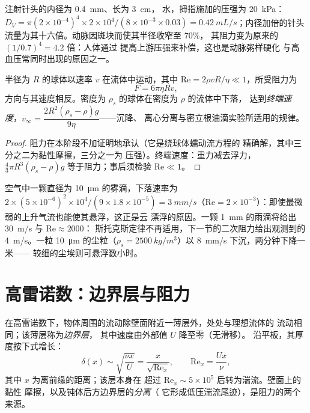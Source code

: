 \begin{example}[四次方]\label{ex:b2:viscous-flows:fourth}
注射针头的内径为 \qty{0.4}{mm}、长为 \qty{3}{cm}，
水，拇指施加的压强为 \qty{20}{kPa}：$D_V = \pi(2 \times 10^{-4})^4 \times 2 \times
10^4/(8 \times 10^{-3} \times 0.03) = \qty{0.42}{mL/s}$；内径加倍的针头
流量为其十六倍。动脉因斑块而使其半径收窄至 $70\%$，
其阻力变为原来的 $(1/0.7)^4 = 4.2$ 倍：人体通过
提高上游压强来补偿，这也是动脉粥样硬化
与高血压常同时出现的原因之一。
\end{example}

\begin{proposition}[斯托克斯阻力]\label{prop:b2:viscous-flows:stokes}
半径为 $R$ 的球体以速率 $v$ 在流体中运动，其中
$\mathrm{Re} = 2\rho vR/\eta \ll 1$，所受阻力为
\[
F = 6\pi\eta Rv ,
\]
方向与其速度相反。密度为 $\rho_s$ 的球体在密度为 $\rho$ 的流体中下落，
达到\emph{终端速度}，$v_\infty =
\dfrac{2R^2(\rho_s - \rho)g}{9\eta}$——沉降、
离心分离与密立根油滴实验所适用的规律。
\end{proposition}

\begin{proof}
阻力在本阶段不加证明地承认（它是绕球体蠕动流方程的
精确解，其中三分之二为黏性摩擦，三分之一为
压强）。终端速度：重力减去浮力，$\tfrac43\pi R^3(\rho_s -
\rho)g$ 等于阻力；事后须检验 $\mathrm{Re} \ll 1$。
\end{proof}

\begin{example}[雾、雨与尘埃]\label{ex:b2:viscous-flows:fog}
空气中一颗直径为 \qty{10}{\micro m} 的雾滴，下落速率为 $2 \times (5 \times
10^{-6})^2 \times 10^4/(9 \times 1.8 \times 10^{-5}) = \qty{3}{mm/s}$（$\mathrm{Re} = 2 \times
10^{-3}$）：即使最微弱的上升气流也能使其悬浮，这正是云
漂浮的原因。一颗 \qty{1}{mm} 的雨滴将给出 \qty{30}{m/s} 与 $\mathrm{Re} \approx 2000$：
斯托克斯定律不再适用，下一节的二次阻力给出观测到的
\qty{4}{m/s}。一粒 \qty{10}{\micro m} 的尘粒（$\rho_s =
\qty{2500}{kg/m^3}$）以 \qty{8}{mm/s} 下沉，两分钟下降一米——
较细的尘埃则可悬浮数小时。
\end{example}

\section{高雷诺数：边界层与阻力}

\begin{proposition}[边界层]\label{prop:b2:viscous-flows:bl}
在高雷诺数下，物体周围的流动除壁面附近一薄层外，处处与理想流体的
流动相同；该薄层称为\emph{边界层}，
其中速度由外部值 $U$ 降至零（无滑移）。
沿平板，其厚度按下式增长：
\[
\delta(x) \sim \sqrt{\frac{\nu x}{U}} = \frac{x}{\sqrt{\mathrm{Re}_x}} ,
\qquad \mathrm{Re}_x = \frac{Ux}{\nu} ,
\]
其中 $x$ 为离前缘的距离；该层本身在
超过 $\mathrm{Re}_x \sim 5 \times 10^5$ 后转为湍流。壁面上的黏性
摩擦，以及钝体后方边界层的\emph{分离}（
它形成低压湍流尾迹），是阻力的两个来源。
\end{proposition}

